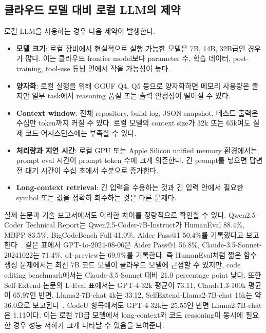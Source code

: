 \documentclass[11pt,a4paper]{article}
\begin{document}
\subsection{클라우드 모델 대비 로컬 LLM의 제약}

로컬 LLM을 사용하는 경우 다음 제약이 발생한다.

\begin{itemize}
  \item \textbf{모델 크기}: 로컬 장비에서 현실적으로 실행 가능한 모델은 7B, 14B, 32B급인 경우가 많다. 이는 클라우드 frontier model보다 parameter 수, 학습 데이터, post-training, tool-use 튜닝 면에서 작을 가능성이 높다.
  \item \textbf{양자화}: 로컬 실행을 위해 GGUF Q4, Q5 등으로 양자화하면 메모리 사용량은 줄지만 일부 task에서 reasoning 품질 또는 출력 안정성이 떨어질 수 있다.
  \item \textbf{Context window}: 전체 repository, build log, JSON snapshot, 테스트 출력은 수십만 token까지 커질 수 있다. 로컬 모델의 context size가 32k 또는 65k여도 실제 코드 어시스턴스에는 부족할 수 있다.
  \item \textbf{처리량과 지연 시간}: 로컬 GPU 또는 Apple Silicon unified memory 환경에서는 prompt eval 시간이 prompt token 수에 크게 의존한다. 긴 prompt를 넣으면 답변 전 대기 시간이 수십 초에서 수분으로 증가한다.
  \item \textbf{Long-context retrieval}: 긴 입력을 수용하는 것과 긴 입력 안에서 필요한 symbol 또는 값을 정확히 회수하는 것은 다른 문제다.
\end{itemize}

실제 논문과 기술 보고서에서도 이러한 차이를 정량적으로 확인할 수 있다. Qwen2.5-Coder Technical Report는 Qwen2.5-Coder-7B-Instruct가 HumanEval 88.4\%, MBPP 83.5\%, BigCodeBench Full 41.0\%, Aider Pass@1 50.4\%를 기록했다고 보고한다~\cite{hui2024qwen25coder}. 같은 표에서 GPT-4o-2024-08-06은 Aider Pass@1 56.8\%, Claude-3.5-Sonnet-20241022는 71.4\%, o1-preview는 69.9\%를 기록한다. 즉 HumanEval처럼 짧은 함수 생성 문제에서는 최신 7B 코드 모델이 클라우드 모델에 근접할 수 있지만, code editing benchmark에서는 Claude-3.5-Sonnet 대비 21.0 percentage point 낮다. 또한 Self-Extend 논문의 L-Eval 표에서는 GPT-4-32k 평균이 73.11, Claude1.3-100k 평균이 65.97인 반면, Llama2-7B-chat 4k는 33.12, SelfExtend-Llama2-7B-chat 16k는 약 36.0으로 보고된다~\cite{jin2024selfextend}. CodeU 항목에서도 GPT-4-32k는 25.55인 반면 Llama2-7B-chat은 1.11이다. 이는 로컬 7B급 모델에서 long-context와 코드 reasoning이 동시에 필요한 경우 성능 저하가 크게 나타날 수 있음을 보여준다.
\end{document}
